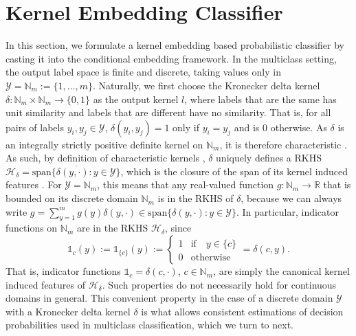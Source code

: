 \documentclass{article}
\begin{document}
\section{Kernel Embedding Classifier}
\label{sec:kernel_embedding_classifier}

	In this section, we formulate a kernel embedding based probabilistic classifier by casting it into the conditional embedding framework. In the multiclass setting, the output label space is finite and discrete, taking values only in $\mathcal{Y} = \mathbb{N}_{m} := \{1, \dots, m\}$. Naturally, we first choose the Kronecker delta kernel $\delta : \mathbb{N}_{m} \times \mathbb{N}_{m} \to \{0, 1\}$ as the output kernel $l$, where labels that are the same has unit similarity and labels that are different have no similarity. That is, for all pairs of labels $y_{i}, y_{j} \in \mathcal{Y}$, $\delta(y_{i}, y_{j}) = 1$ only if $y_{i} = y_{j}$ and is $0$ otherwise. As $\delta$ is an integrally strictly positive definite kernel on $\mathbb{N}_{m}$, it is therefore characteristic \citep[Theorem 7]{sriperumbudur2010hilbert}. As such, by definition of characteristic kernels \citep{fukumizu2004dimensionality}, $\delta$ uniquely defines a RKHS  $\mathcal{H}_{\delta} = \overline{\mathrm{span}\{\delta(y, \cdot) : y \in \mathcal{Y}\}}$, which is the closure of the span of its kernel induced features \citep{xu2009refinement}. For $\mathcal{Y} = \mathbb{N}_{m}$, this means that any real-valued function $g : \mathbb{N}_{m} \to \mathbb{R}$ that is bounded on its discrete domain $\mathbb{N}_{m}$ is in the RKHS of $\delta$, because we can always write $g = \sum_{y = 1}^{m} g(y) \delta(y, \cdot) \in \mathrm{span}\{\delta(y, \cdot) : y \in \mathcal{Y}\}$. In particular, indicator functions on $\mathbb{N}_{m}$ are in the RKHS $\mathcal{H}_{\delta}$, since
	\begin{equation}
		\mathbb{1}_{c}(y) := \mathbb{1}_{\{c\}}(y) := \begin{cases}
		1 & \mathrm{if } \quad y \in \{c\} \\
		0 & \mathrm{otherwise}
		\end{cases} = \delta(c, y).
	\label{eq:indicator_function}
	\end{equation}
	That is, indicator functions $\mathbb{1}_{c} = \delta(c, \cdot)$, $c \in \mathbb{N}_{m}$, are simply the canonical kernel induced features of $\mathcal{H}_{\delta}$. Such properties do not necessarily hold for continuous domains in general. This convenient property in the case of a discrete domain $\mathcal{Y}$ with a Kronecker delta kernel $\delta$ is what allows consistent estimations of decision probabilities used in multiclass classification, which we turn to next.
	
\end{document}
